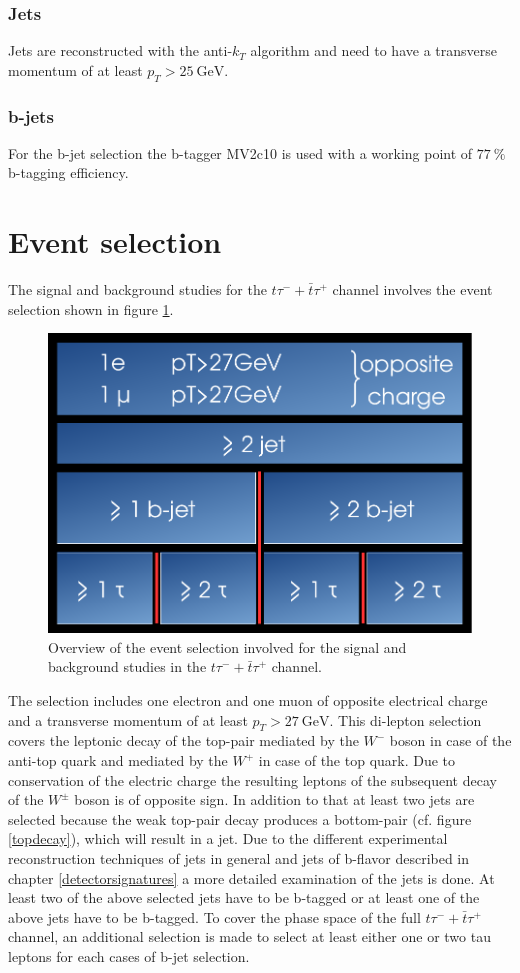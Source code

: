 \subsubsection*{Jets}
Jets are reconstructed with the anti-$k_T$ algorithm and need to have a transverse momentum of at least $p_T>\SI{25}{\giga\electronvolt}$. 
\subsubsection*{b-jets}\label{physObj:bjet}
For the b-jet selection the b-tagger MV2c10 is used with a working point of $\SI{77}{\percent}$ b-tagging efficiency.
\section{Event selection}\label{eventselection}
The signal and background studies for the $t\tau^{-}+\bar{t}\tau^{+}$ channel involves the event selection shown in figure \ref{selection}.\newline
%
\begin{figure}[htbp]                                 
 \begin{center}                                       
  \includegraphics[width=0.45\linewidth]{figures/selection.pdf} 
   \caption[Overview of the event selection.]{Overview of the event selection involved for the signal and background studies in the $t\tau^{-}+\bar{t}\tau^{+}$ channel.}
  \label{selection}                                    
 \end{center}
\end{figure}
%
The selection includes one electron and one muon of opposite electrical charge and a transverse momentum of at least $p_T>\SI{27}{\giga\electronvolt}$. This di-lepton selection covers the leptonic decay of the top-pair mediated by the $W^-$ boson in case of the anti-top quark and mediated by the $W^+$ in case of the top quark. Due to conservation of the electric charge the resulting leptons of the subsequent decay of the $W^\pm$ boson is of opposite sign. In addition to that at least two jets are selected because the weak top-pair decay produces a bottom-pair (cf. figure \ref{topdecay}), which will result in a jet. Due to the different experimental reconstruction techniques of jets in general and jets of b-flavor described in chapter \ref{detectorsignatures} a more detailed examination of the jets is done. At least two of the above selected jets have to be b-tagged or at least one of the above jets have to be b-tagged. To cover the phase space of the full $t\tau^{-}+\bar{t}\tau^{+}$ channel, an additional selection is made to select at least either one or two tau leptons for each cases of b-jet selection.    
